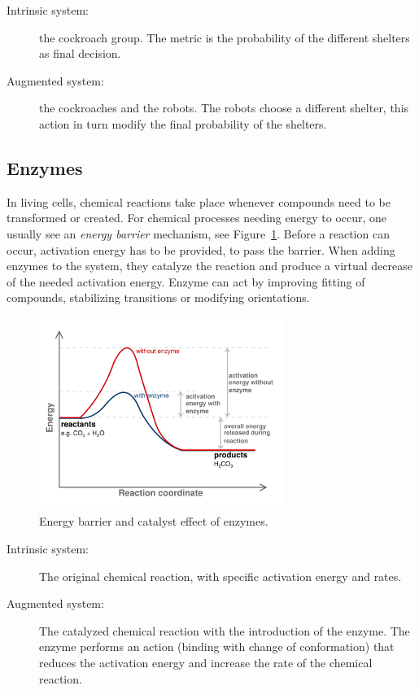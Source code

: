 \begin{description}
	\item[Intrinsic system:] the cockroach group. The metric is the probability of the different shelters as final decision.
	\item[Augmented system:] the cockroaches and the robots. The robots choose a different shelter, this action in turn modify the final probability of the shelters.
\end{description}

\subsection{Enzymes} %
\label{sub:enzymes}
In living cells, chemical reactions take place whenever compounds need to be transformed or created. For chemical processes needing energy to occur, one usually see an \textit{energy barrier} mechanism, see Figure~\ref{fig:img_enzyme_activity}. Before a reaction can occur, activation energy has to be provided, to pass the barrier. When adding enzymes to the system, they catalyze the reaction and produce a virtual decrease of the needed activation energy. Enzyme can act by improving fitting of compounds, stabilizing transitions or modifying orientations.

\begin{figure}[h]
	\centering
		\includegraphics[width=8cm]{img/enzyme_activity.png}
	\caption{Energy barrier and catalyst effect of enzymes.}
	\label{fig:img_enzyme_activity}
\end{figure}

\begin{description}
	\item[Intrinsic system:] The original chemical reaction, with specific activation energy and rates.
	\item[Augmented system:] The catalyzed chemical reaction with the introduction of the enzyme. The enzyme performs an action (binding with change of conformation) that reduces the activation energy and increase the rate of the chemical reaction.
\end{description}

